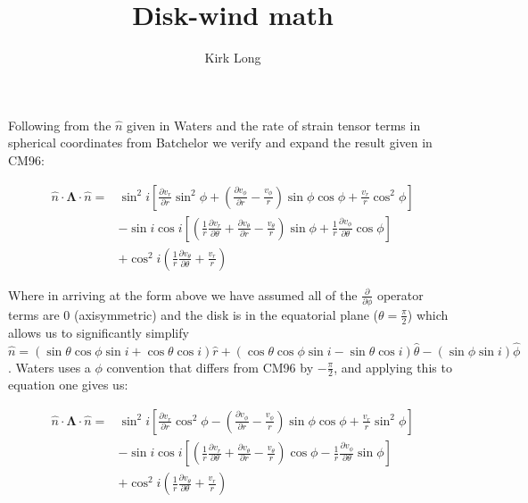 \documentclass{article}
\title{Disk-wind math}
\author{Kirk Long}
\begin{document}
\maketitle

Following from the $\hat{n}$ given in Waters and the rate of strain tensor terms in spherical coordinates from Batchelor we verify and expand the result given in CM96:

\begin{equation} \label{eq1}
\begin{split}
\hat{n}\cdot\boldsymbol{\Lambda}\cdot\hat{n} = & \sin^2i\left[\frac{\partial v_r}{\partial r}\sin^2\phi + \left(\frac{\partial v_\phi}{\partial r} - \frac{v_\phi}{r}\right)\sin\phi\cos\phi + \frac{v_r}{r}\cos^2\phi \right] \\
& -\sin i\cos i\left[\left(\frac{1}{r}\frac{\partial v_r}{\partial \theta} + \frac{\partial v_\theta}{\partial r} - \frac{v_\theta}{r}\right)\sin\phi  + \frac{1}{r}\frac{\partial v_\phi}{\partial \theta}\cos\phi\right] \\
& +\cos^2i\left(\frac{1}{r}\frac{\partial v_\theta}{\partial \theta} + \frac{v_r}{r}\right)
\end{split}
\end{equation}

Where in arriving at the form above we have assumed all of the $\frac{\partial}{\partial \phi}$ operator terms are 0 (axisymmetric) and the disk is in the equatorial plane ($\theta = \frac{\pi}{2}$) which allows us to significantly simplify $\hat{n} = \left(\sin\theta\cos\phi\sin i + \cos\theta\cos i\right)\hat{r} + \left(\cos\theta\cos\phi\sin i - \sin\theta\cos i\right)\hat{\theta} - \left(\sin\phi\sin i\right)\hat{\phi}$. Waters uses a $\phi$ convention that differs from CM96 by $-\frac{\pi}{2}$, and applying this to equation one gives us:

\begin{equation} \label{eq2}
\begin{split}
\hat{n}\cdot\boldsymbol{\Lambda}\cdot\hat{n} = & \sin^2i\left[\frac{\partial v_r}{\partial r}\cos^2\phi - \left(\frac{\partial v_\phi}{\partial r} - \frac{v_\phi}{r}\right)\sin\phi\cos\phi + \frac{v_r}{r}\sin^2\phi \right] \\
& -\sin i\cos i\left[\left(\frac{1}{r}\frac{\partial v_r}{\partial \theta} + \frac{\partial v_\theta}{\partial r} - \frac{v_\theta}{r}\right) \cos\phi - \frac{1}{r}\frac{\partial v_\phi}{\partial \theta}\sin\phi\right] \\
& +\cos^2i\left(\frac{1}{r}\frac{\partial v_\theta}{\partial \theta} + \frac{v_r}{r}\right)
\end{split}
\end{equation}
\end{document}

